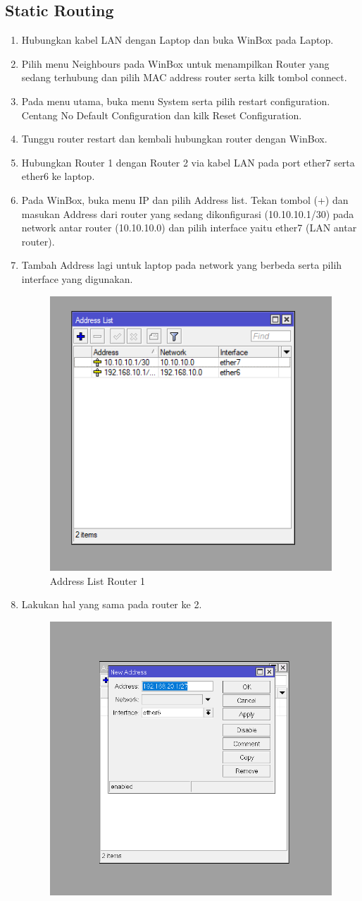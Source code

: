 \subsection{Static Routing}
\begin{enumerate}
    \item Hubungkan kabel LAN dengan Laptop dan buka WinBox pada Laptop.
    \item Pilih menu Neighbours pada WinBox untuk menampilkan Router yang sedang terhubung dan pilih MAC address router serta kilk tombol connect.
    \item Pada menu utama, buka menu System serta pilih restart configuration. Centang No Default Configuration dan kilk Reset Configuration.
    \item Tunggu router restart dan kembali hubungkan router dengan WinBox.
    \item Hubungkan Router 1 dengan Router 2 via kabel LAN pada port ether7 serta ether6 ke laptop.
    \item Pada WinBox, buka menu IP dan pilih Address list. Tekan tombol (+) dan masukan Address dari router yang sedang dikonfigurasi (10.10.10.1/30) pada network antar router (10.10.10.0) dan pilih interface yaitu ether7 (LAN antar router).
    \item Tambah Address lagi untuk laptop pada network yang berbeda serta pilih interface yang digunakan.
        \begin{figure}[H]
            \centering
            \includegraphics[width=0.5\linewidth]{P1/img/address list static.png}
            \caption{Address List Router 1}
            \label{fig:enter-label}
        \end{figure}
    \item Lakukan hal yang sama pada router ke 2.
        \begin{figure}[H]
            \centering
            \includegraphics[width=0.35\linewidth]{P1/img/Address Laptop Router 2.png}

\end{figure}
\end{enumerate}
